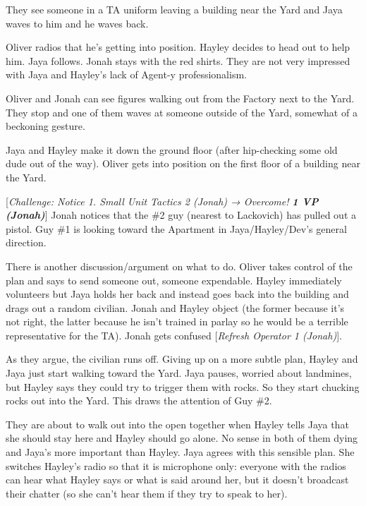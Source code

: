 They see someone in a TA uniform leaving a building near the Yard and Jaya waves to him and he waves back.



Oliver radios that he's getting into position.  Hayley decides to head out to help him.  Jaya follows.  Jonah stays with the red shirts.  They are not very impressed with Jaya and Hayley's lack of Agent-y professionalism.



Oliver and Jonah can see figures walking out from the Factory next to the Yard.   They stop and one of them waves at someone outside of the Yard, somewhat of a beckoning gesture.



Jaya and Hayley make it down the ground floor (after hip-checking some old dude out of the way).  Oliver gets into position on the first floor of a building near the Yard.



{[}\textit{Challenge: Notice 1.  Small Unit Tactics 2 (Jonah) → Overcome! }\textit{\textbf{1 VP (Jonah)}}{]}  Jonah notices that the \#2 guy (nearest to Lackovich) has pulled out a pistol.  Guy \#1 is looking toward the Apartment in Jaya/Hayley/Dev's general direction. 



There is another discussion/argument on what to do.  Oliver takes control of the plan and says to send someone out, someone expendable.  Hayley immediately volunteers but Jaya holds her back and instead goes back into the building and drags out a random civilian.  Jonah and Hayley object (the former because it's not right, the latter because he isn't trained in parlay so he would be a terrible representative for the TA).   Jonah gets confused {[}\textit{Refresh Operator 1 (Jonah)}{]}.



As they argue, the civilian runs off.  Giving up on a more subtle plan, Hayley and Jaya just start walking toward the Yard.  Jaya pauses, worried about landmines, but Hayley says they could try to trigger them with rocks.  So they start chucking rocks out into the Yard.  This draws the attention of Guy \#2.



They are about to walk out into the open together when Hayley tells Jaya that she should stay here and Hayley should go alone.  No sense in both of them dying and Jaya's more important than Hayley.  Jaya agrees with this sensible plan.  She switches Hayley's radio so that it is microphone only: everyone with the radios can hear what Hayley says or what is said around her, but it doesn't broadcast their chatter (so she can't hear them if they try to speak to her).



